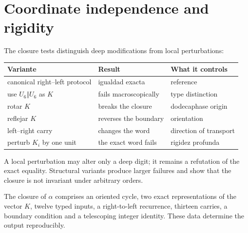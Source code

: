 \section{Coordinate independence and rigidity}

The closure tests distinguish deep modifications from local
perturbations:
\begin{center}
\small
\begin{tabularx}{\textwidth}{@{}lYY@{}}
\toprule
Variante & Result & What it controls \\
\midrule
canonical right--left protocol & igualdad exacta & reference \\
use \(U_6\Vert U_6\) as \(K\) & fails macroscopically & type distinction \\
rotar \(K\) & breaks the closure & dodecaphase origin \\
reflejar \(K\) & reverses the boundary & orientation \\
left--right carry & changes the word & direction of transport \\
perturb \(K_i\) by one unit & the exact word fails & rigidez profunda \\
\bottomrule
\end{tabularx}
\end{center}
A local perturbation may alter only a deep digit; it remains a
refutation of the exact equality. Structural variants produce larger
failures and show that the closure is not invariant under arbitrary orders.

\begin{remark}
The closure of \(\alpha\) comprises an oriented cycle, two exact
representations of the vector \(K\), twelve typed inputs, a right-to-left
recurrence, thirteen carries, a boundary condition and a telescoping integer
identity. These data determine the output reproducibly.
\end{remark}
